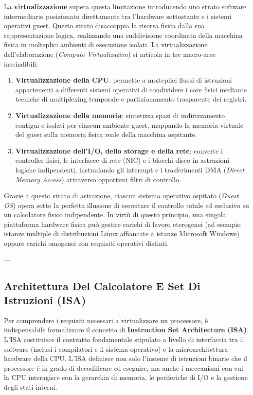 \documentclass[11pt, a4paper]{article}
\begin{document}
La \textbf{virtualizzazione} supera questa limitazione introducendo uno strato software intermediario posizionato direttamente tra l'hardware sottostante e i sistemi operativi guest. Questo strato disaccoppia la risorsa fisica dalla sua rappresentazione logica, realizzando una suddivisione coordinata della macchina fisica in molteplici ambienti di esecuzione isolati.
La virtualizzazione dell'elaborazione (\emph{Compute Virtualization}) si articola in tre macro-aree inscindibili:
\begin{enumerate}
    \item \textbf{Virtualizzazione della CPU}: permette a molteplici flussi di istruzioni appartenenti a differenti sistemi operativi di condividere i core fisici mediante tecniche di multiplexing temporale e partizionamento trasparente dei registri.
    \item \textbf{Virtualizzazione della memoria}: sintetizza spazi di indirizzamento contigui e isolati per ciascun ambiente guest, mappando la memoria virtuale del guest sulla memoria fisica reale della macchina ospitante.
    \item \textbf{Virtualizzazione dell'I/O, dello storage e della rete}: converte i controller fisici, le interfacce di rete (NIC) e i blocchi disco in astrazioni logiche indipendenti, instradando gli interrupt e i trasferimenti DMA (\emph{Direct Memory Access}) attraverso opportuni filtri di controllo.
\end{enumerate}

Grazie a questo strato di astrazione, ciascun sistema operativo ospitato (\emph{Guest OS}) opera sotto la perfetta illusione di esercitare il controllo totale ed esclusivo su un calcolatore fisico indipendente. In virtù di questo principio, una singola piattaforma hardware fisica può gestire carichi di lavoro eterogenei (ad esempio istanze multiple di distribuzioni Linux affiancate a istanze Microsoft Windows) oppure carichi omogenei con requisiti operativi distinti.

---

\subsection{Architettura Del Calcolatore E Set Di Istruzioni (ISA)}

Per comprendere i requisiti necessari a virtualizzare un processore, è indispensabile formalizzare il concetto di \textbf{Instruction Set Architecture (ISA)}. L'ISA costituisce il contratto fondamentale stipulato a livello di interfaccia tra il software (inclusi i compilatori e il sistema operativo) e la microarchitettura hardware della CPU. L'ISA definisce non solo l'insieme di istruzioni binarie che il processore è in grado di decodificare ed eseguire, ma anche i meccanismi con cui la CPU interagisce con la gerarchia di memoria, le periferiche di I/O e la gestione degli stati interni.
\end{document}
